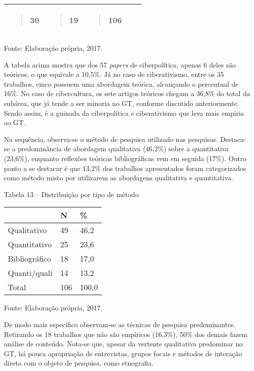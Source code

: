 \begin{longtable}[]{@{}lllll@{}}
\begin{minipage}[t]{0.19\columnwidth}
\begin{quote}
30
\end{quote}\strut
\end{minipage} & \begin{minipage}[t]{0.19\columnwidth}\raggedright\strut
\begin{quote}
19
\end{quote}\strut
\end{minipage} & \begin{minipage}[t]{0.19\columnwidth}\raggedright\strut
\begin{quote}
106
\end{quote}\strut
\end{minipage}\tabularnewline
\bottomrule
\end{longtable}

Fonte: Elaboração própria, 2017.

A tabela acima mostra que dos 57 \emph{papers} de ciberpolítica, apenas
6 deles são teóricos, o que equivale a 10,5\%. Já no caso de
ciberativismo, entre os 35 trabalhos, cinco possuem uma abordagem
teórica, alcançando o percentual de 16\%. No caso de cibercultura, os
sete artigos teóricos chegam a 36,8\% do total da subárea, que já tende
a ser minoria no GT, conforme discutido anteriormente. Sendo assim, é a
guinada da ciberpolítica e ciberativismo que leva mais empiria ao GT.

Na sequência, observa-se o método de pesquisa utilizado nas pesquisas.
Destaca-se a predominância de abordagem qualitativa (46,2\%) sobre a
quantitativa (23,6\%), enquanto reflexões teóricas bibliográficas vem em
seguida (17\%). Outro ponto a se destacar é que 13,2\% dos trabalhos
apresentados foram categorizados como método misto por utilizarem as
abordagens qualitativa e quantitativa.

Tabela 13 -- Distribuição por tipo de método

\begin{longtable}[]{@{}lll@{}}
\toprule
~ & N & \%\tabularnewline
\midrule
\endhead
Qualitativo & 49 & 46,2\tabularnewline
Quantitativo & 25 & 23,6\tabularnewline
Bibliográfico & 18 & 17,0\tabularnewline
Quanti/quali & 14 & 13,2\tabularnewline
Total & 106 & 100,0\tabularnewline
\bottomrule
\end{longtable}

Fonte: Elaboração própria, 2017.

De modo mais específico observam-se as técnicas de pesquisa
predominantes. Retirando os 18 trabalhos que não são empíricos (16,3\%),
50\% dos demais fazem análise de conteúdo. Nota-se que, apesar da
vertente qualitativa predominar no GT, há pouca apropriação de
entrevistas, grupos focais e métodos de interação direta com o objeto de
pesquisa, como etnografia.

